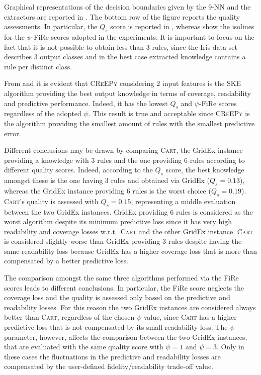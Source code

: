 \documentclass{article}
\newcommand{\gridex}{GridEx}
\newcommand{\creepy}{\textsc{CReEPy}}
\newcommand{\cart}{\textsc{Cart}}
\newcommand{\fire}{FiRe}
\newcommand{\psifire}{$\psi$-\fire}
\begin{document}
Graphical representations of the decision boundaries given by the 9-NN and the extractors are reported in .
%
The bottom row of the figure reports the quality assessments.
%
In particular, the $Q_s$ score is reported in , whereas  show the isolines for the \psifire{} scores adopted in the experiments.
%
It is important to focus on the fact that it is not possible to obtain less than 3 rules, since the Iris data set describes 3 output classes and in the best case extracted knowledge contains a rule per distinct class.

From  and  it is evident that \creepy{} considering 2 input features is the SKE algorithm providing the best output knowledge in terms of coverage, readability and predictive performance.
%
Indeed, it has the lowest $Q_s$ and \psifire{} scores regardless of the adopted $\psi$.
%
This result is true and acceptable since \creepy{} is the algorithm providing the smallest amount of rules with the smallest predictive error.

Different conclusions may be drawn by comparing \cart{}, the \gridex{} instance providing a knowledge with 3 rules and the one providing 6 rules according to different quality scores.
%
Indeed, according to the $Q_s$ score, the best knowledge amongst these is the one having 3 rules and obtained via \gridex{} ($Q_s=0.13$), whereas the \gridex{} instance providing 6 rules is the worst choice ($Q_s=0.19$).
%
\cart{}'s quality is assessed with $Q_s=0.15$, representing a middle evaluation between the two \gridex{} instances.
%
\gridex{} providing 6 rules is considered as the worst algorithm despite its minimum predictive loss since it has very high readability and coverage losses w.r.t.\ \cart{} and the other \gridex{} instance.
%
\cart{} is considered slightly worse than \gridex{} providing 3 rules despite having the same readability loss because \gridex{} has a higher coverage loss that is more than compensated by a better predictive loss.

The comparison amongst the same three algorithms performed via the \fire{} scores leads to different conclusions.
%
In particular, the \fire{} score neglects the coverage loss and the quality is assessed only based on the predictive and readability losses.
%
For this reason the two \gridex{} instances are considered always better than \cart{}, regardless of the chosen $\psi$ value, since \cart{} has a higher predictive loss that is not compensated by its small readability loss.
%
The $\psi$ parameter, however, affects the comparison between the two \gridex{} instances, that are evaluated with the same quality score with $\psi=1$ and $\psi=3$.
%
Only in these cases the fluctuations in the predictive and readability losses are compensated by the user-defined fidelity/readability trade-off value.
\end{document}
